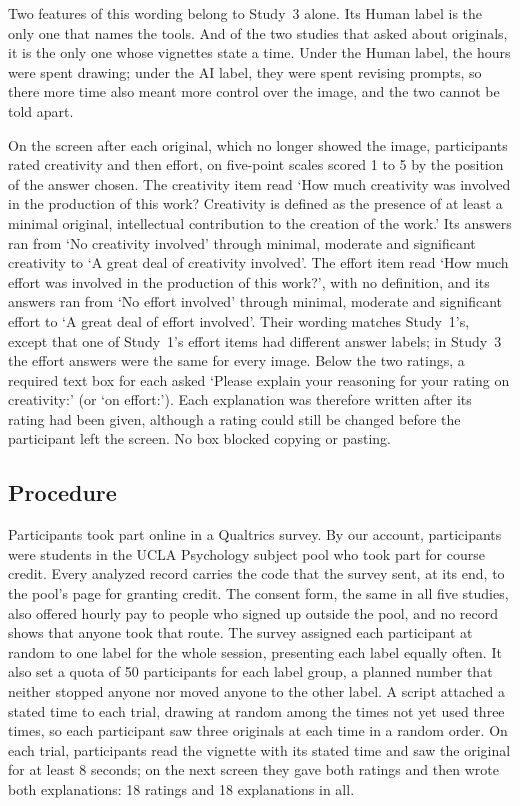 Two features of this wording belong to Study~3 alone. Its Human label is the only one that names the tools. And of the two studies that asked about originals, it is the only one whose vignettes state a time. Under the Human label, the hours were spent drawing; under the AI label, they were spent revising prompts, so there more time also meant more control over the image, and the two cannot be told apart.

On the screen after each original, which no longer showed the image, participants rated creativity and then effort, on five-point scales scored 1 to 5 by the position of the answer chosen. The creativity item read `How much creativity was involved in the production of this work? Creativity is defined as the presence of at least a minimal original, intellectual contribution to the creation of the work.' Its answers ran from `No creativity involved' through minimal, moderate and significant creativity to `A great deal of creativity involved'. The effort item read `How much effort was involved in the production of this work?', with no definition, and its answers ran from `No effort involved' through minimal, moderate and significant effort to `A great deal of effort involved'. Their wording matches Study~1's, except that one of Study~1's effort items had different answer labels; in Study~3 the effort answers were the same for every image. Below the two ratings, a required text box for each asked `Please explain your reasoning for your rating on creativity:' (or `on effort:'). Each explanation was therefore written after its rating had been given, although a rating could still be changed before the participant left the screen. No box blocked copying or pasting.

\subsection*{Procedure}

Participants took part online in a Qualtrics survey. By our account, participants were students in the UCLA Psychology subject pool who took part for course credit. Every analyzed record carries the code that the survey sent, at its end, to the pool's page for granting credit. The consent form, the same in all five studies, also offered hourly pay to people who signed up outside the pool, and no record shows that anyone took that route. The survey assigned each participant at random to one label for the whole session, presenting each label equally often. It also set a quota of 50 participants for each label group, a planned number that neither stopped anyone nor moved anyone to the other label. A script attached a stated time to each trial, drawing at random among the times not yet used three times, so each participant saw three originals at each time in a random order. On each trial, participants read the vignette with its stated time and saw the original for at least 8 seconds; on the next screen they gave both ratings and then wrote both explanations: 18 ratings and 18 explanations in all.

